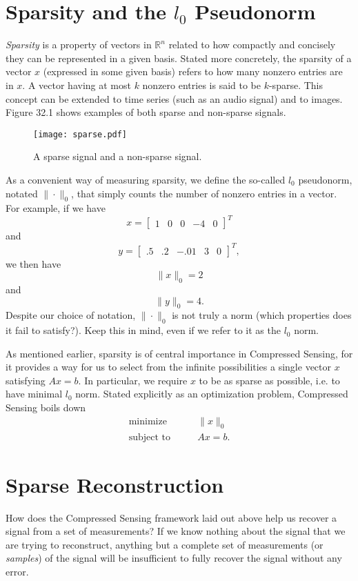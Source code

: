 \section*{Sparsity and the $l_0$ Pseudonorm}
\emph{Sparsity} is a property of vectors in $\mathbb{R}^n$ related to how compactly and concisely they can
be represented in a given basis. Stated more concretely, the sparsity of a vector $x$ (expressed in some given
basis) refers to how many nonzero entries are in $x$. A vector having at most $k$ nonzero entries is said to be
$k$-sparse. This concept can be extended to time series (such as an audio signal) and to images. Figure 32.1 shows
examples of both sparse and non-sparse signals.

\begin{figure}
\centering
\texttt{[image: sparse.pdf]}
\caption{A sparse signal and a non-sparse signal.}
\label{fig:sparse}
\end{figure}

As a convenient way of measuring sparsity, we define the so-called $l_0$ pseudonorm, notated $\|\cdot\|_0$,
that simply counts the number of nonzero entries in a vector. For example, if we have
\[
x = 
\begin{bmatrix}
1&0&0&-4&0
\end{bmatrix}^T
\]
and
\[
y = 
\begin{bmatrix}
.5&.2&-.01&3&0
\end{bmatrix}^T,
\]
we then have
\[
\|x\|_0 = 2
\]
and
\[
\|y\|_0 = 4.
\]
Despite our choice of notation, $\|\cdot\|_0$ is not truly a norm (which properties does it fail to satisfy?).
Keep this in mind, even if we refer to it as the $l_0$ norm. 

As mentioned earlier, sparsity is of central importance in Compressed Sensing, for it provides a way for us to 
select from the infinite possibilities a single vector $x$ satisfying $Ax = b$. In particular, we require $x$ to 
be as sparse as possible, i.e. to have minimal $l_0$ norm. Stated explicitly as an optimization problem, Compressed
Sensing boils down 
\begin{align*}
\text{minimize}\qquad &\|x\|_0\\
\text{subject to} \qquad &Ax = b.
\end{align*}

\section*{Sparse Reconstruction}
How does the Compressed Sensing framework laid out above help us recover a signal from a set of measurements? 
If we know nothing about the signal that we are trying to reconstruct, anything but a complete set of measurements
(or \emph{samples}) of the signal will be insufficient to fully recover the signal without any error. 

